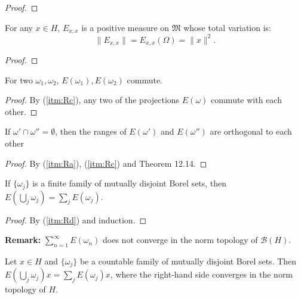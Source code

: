 \begin{proof}
\end{proof}

\begin{lemma}
  \label{lem:resId_measure}
  For any $x \in H$,
  \( E_{x,x} \) is a positive measure on \( \mathfrak{M} \) whose total variation is:
  \[
    \|E_{x,x}\| = E_{x,x}(\Omega) = \|x\|^2.
  \]
\end{lemma}

\begin{proof}

\end{proof}

\begin{lemma}
  \label{lem:resId_comm}
  For two $\omega_1, \omega_2$, \( E(\omega_1), E(\omega_2) \) commute.
\end{lemma}

\begin{proof}
  By (\ref{itm:Rc}), any two of the projections \( E(\omega) \) commute with each other.
\end{proof}

\begin{lemma}
  If \( \omega' \cap \omega'' = \emptyset \),
  then the ranges of \( E(\omega') \) and \( E(\omega'') \) are orthogonal to each other
\end{lemma}

\begin{proof}
  By (\ref{itm:Ra}), (\ref{itm:Rc}) and Theorem 12.14.
\end{proof}

\begin{lemma}
  If $\{\omega_j\}$ is a finite family of mutually disjoint Borel sets, then
  $E(\bigcup_j \omega_j) = \sum_j E(\omega_j)$.
\end{lemma}

\begin{proof}
  By (\ref{itm:Rd}) and induction.
\end{proof}

\textbf{Remark:}
$\sum_{n=1}^{\infty} E(\omega_n)$ does not converge in the norm topology of $\mathcal{B}(H)$.

\begin{lemma}
  \label{lem:resId_iSum}
  Let $x \in H$ and $\{\omega_j\}$ be a countable family of mutually disjoint Borel sets.
  Then $E(\bigcup_j \omega_j)x = \sum_j E(\omega_j)x$, where
  the right-hand side converges in the norm topology of $H$.
\end{lemma}

